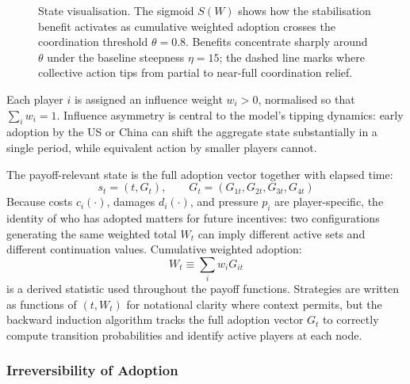 \documentclass[10pt,a4paper]{article}
\begin{document}
\begin{figure}[htbp]
\centering
{}
\caption{State visualisation. The sigmoid $S(W)$ shows how the stabilisation benefit
activates as cumulative weighted adoption crosses the coordination threshold $\theta = 0.8$.
Benefits concentrate sharply around $\theta$ under the baseline steepness $\eta = 15$;
the dashed line marks where collective action tips from partial to near-full coordination relief.}
\label{fig:state_viz}
\end{figure}

Each player $i$ is assigned an influence weight $w_i > 0$, normalised so that $\sum_i w_i = 1$.
Influence asymmetry is central to the model's tipping dynamics: early adoption by the US or
China can shift the aggregate state substantially in a single period, while equivalent action
by smaller players cannot.

The payoff-relevant state is the full adoption vector together with elapsed time:
\[
s_t = (t, G_t), \qquad G_t = (G_{1t}, G_{2t}, G_{3t}, G_{4t})
\]
Because costs $c_i(\cdot)$, damages $d_i(\cdot)$, and pressure $p_i$ are player-specific,
the identity of who has adopted matters for future incentives: two configurations generating
the same weighted total $W_t$ can imply different active sets and different continuation values.
Cumulative weighted adoption:
\[
W_t \equiv \sum_i w_i G_{it}
\]
is a derived statistic used throughout the payoff functions. Strategies are written as functions
of $(t, W_t)$ for notational clarity where context permits, but the backward induction algorithm
tracks the full adoption vector $G_t$ to correctly compute transition probabilities and identify
active players at each node.

\subsubsection*{Irreversibility of Adoption}
\end{document}
